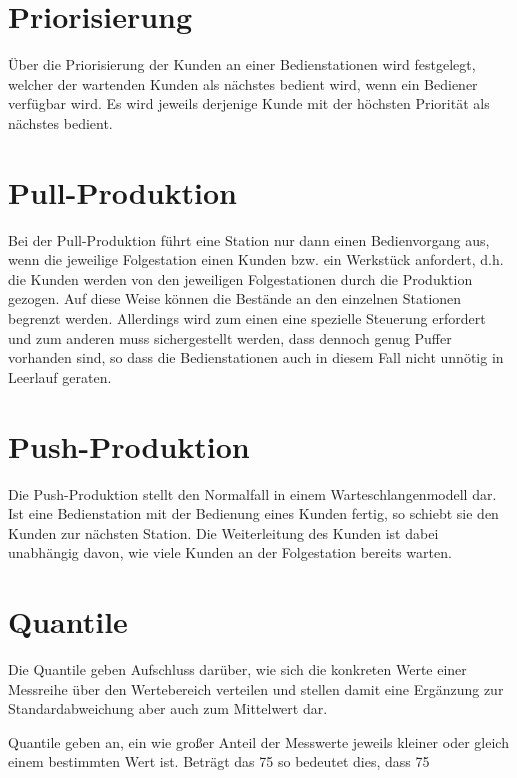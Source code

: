 \section*{Priorisierung}


Über die Priorisierung der Kunden an einer Bedienstationen wird
festgelegt, welcher der wartenden Kunden als nächstes bedient wird, wenn ein Bediener verfügbar wird.
Es wird jeweils derjenige Kunde mit der höchsten Priorität als nächstes bedient.

\section*{Pull-Produktion}


Bei der Pull-Produktion führt eine Station nur dann einen Bedienvorgang aus, wenn die jeweilige
Folgestation einen Kunden bzw. ein Werkstück anfordert, d.h. die Kunden werden von den jeweiligen
Folgestationen durch die Produktion gezogen. Auf diese Weise können die Bestände an den einzelnen
Stationen begrenzt werden. Allerdings wird zum einen eine spezielle Steuerung erfordert und zum
anderen muss sichergestellt werden, dass dennoch genug Puffer vorhanden sind, so dass die Bedienstationen
auch in diesem Fall nicht unnötig in Leerlauf geraten.

\section*{Push-Produktion}


Die Push-Produktion stellt den Normalfall in einem Warteschlangenmodell dar. Ist eine Bedienstation
mit der Bedienung eines Kunden fertig, so schiebt sie den Kunden zur nächsten Station. Die Weiterleitung
des Kunden ist dabei unabhängig davon, wie viele Kunden an der Folgestation bereits warten.

\section*{Quantile}


Die Quantile geben Aufschluss darüber, wie sich die konkreten Werte einer
Messreihe über den Wertebereich verteilen und stellen damit eine Ergänzung
zur Standardabweichung aber
auch zum Mittelwert dar.


Quantile geben an, ein wie großer Anteil der Messwerte jeweils kleiner oder gleich
einem bestimmten Wert ist. Beträgt das 75%
so bedeutet dies, dass 75%

